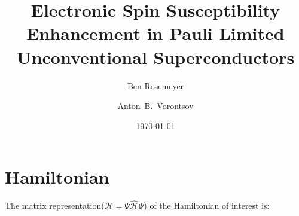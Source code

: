 \documentclass[aps,prl,twocolumn,showpacs,amsmath,amssymb]{revtex4-1}
\newcommand{\red}{\textcolor{red}}
\begin{document}
\title{Electronic Spin Susceptibility Enhancement in Pauli Limited Unconventional Superconductors}

\author{Ben Rosemeyer}
\author{Anton~B.~Vorontsov}


\date{\today}

\begin{abstract}
%
%
\end{abstract} 




\maketitle

\section{Hamiltonian}


The matrix representation($\mathcal{H} = \bar{\Psi}\mathcal{\hat{H}} \Psi$) of the Hamiltonian of interest is:
\end{document}
